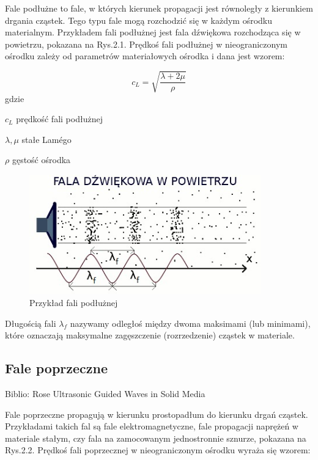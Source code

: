 Fale podłużne to fale, w których kierunek propagacji jest równoległy z kierunkiem drgania cząstek. Tego typu fale mogą rozchodzić się w każdym ośrodku materialnym. Przykładem fali podłużnej jest fala dźwiękowa rozchodząca się w powietrzu, pokazana na Rys.2.1. Prędkoś fali podłużnej w nieograniczonym ośrodku zależy od parametrów materiałowych ośrodka i dana jest wzorem:

\begin{equation}
c_L=\sqrt{\frac{\lambda+2\mu}{\rho}}
\end{equation}
gdzie
\begin{eqwhere}[2cm]
        \item[$c_L$] prędkość fali podłużnej
        \item[$\lambda, \mu$] stałe Lam\'{e}go
        \item[$\rho$] gęstość ośrodka
\end{eqwhere}

\begin{figure}[h]
\centering
\includegraphics[width=10cm]{Zdjecia/2/fala_podluzna}
\caption{Przykład fali podłużnej}
\label{fig:fala_podluzna}
\end{figure}

Długością fali \( \lambda_f \) nazywamy odległoś między dwoma maksimami (lub minimami), które oznaczają maksymalne zagęszczenie (rozrzedzenie) cząstek w materiale.

\subsection{Fale poprzeczne}
Biblio: Rose Ultrasonic Guided Waves in Solid Media

Fale poprzeczne propagują w kierunku prostopadłum do kierunku drgań cząstek. Przykładami takich fal są fale elektromagnetyczne, fale propagacji naprężeń w materiale stałym, czy fala na zamocowanym jednostronnie sznurze, pokazana na Rys.2.2. Prędkoś fali poprzecznej w nieograniczonym ośrodku wyraża się wzorem:

